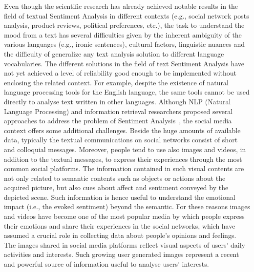 Even though the scientific research has already achieved notable results in the field of textual Sentiment Analysis in different contexts (e.g., social network posts analysis, product reviews, political preferences, etc.), the task to understand the mood from a text has several difficulties given by the inherent ambiguity of the various languages (e.g., ironic sentences), cultural factors, linguistic nuances and the difficulty of generalize any text analysis solution to different language vocabularies. The different solutions in the field of text Sentiment Analysis have not yet achieved a level of reliability good enough to be implemented without enclosing the related context. For example, despite the existence of natural language processing tools for the English language, the same tools cannot be used directly to analyse text written in other languages.
Although NLP (Natural Language Processing) and information retrieval researchers proposed several approaches to address the problem of Sentiment Analysis~\cite{pang2008opinion}, the social media context offers some additional challenges. Beside the huge amounts of available data, typically the textual communications on social networks consist of short and colloquial messages. Moreover, people tend to use also images and videos, in addition to the textual messages, to express their experiences through the most common social platforms.
The information contained in such visual contents are not only related to semantic contents such as objects or actions about the acquired picture, but also cues about affect and sentiment conveyed by the depicted scene. Such information is hence useful to understand the emotional impact (i.e., the evoked sentiment) beyond the semantic.
For these reasons images and videos have become one of the most popular media by which people express their emotions and share their experiences in the social networks, which have assumed a crucial role in collecting data about people's opinions and feelings. %
The images shared in social media platforms reflect visual aspects of users' daily activities and interests. Such growing user generated images represent a recent and powerful source of information useful to analyse users' interests. 
